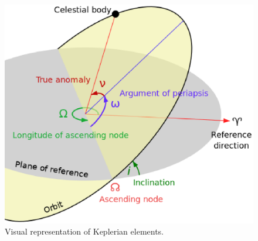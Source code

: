 \begin{figure}
\includegraphics[]{4-images/keplerian_elements}
\caption{Visual representation of Keplerian elements. }
\label{keplerian_elements}
\end{figure}

